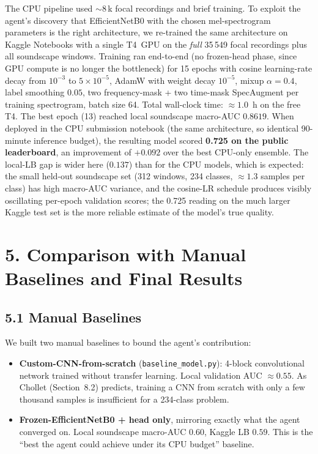 \documentclass[11pt,a4paper]{article}
\begin{document}
The CPU pipeline used $\sim 8$\,k focal recordings and brief training. To exploit the agent's discovery that EfficientNetB0 with the chosen mel-spectrogram parameters is the right architecture, we re-trained the same architecture on Kaggle Notebooks with a single T4~GPU on the \emph{full} 35\,549 focal recordings plus all soundscape windows. Training ran end-to-end (no frozen-head phase, since GPU compute is no longer the bottleneck) for 15 epochs with cosine learning-rate decay from $10^{-3}$ to $5\times10^{-5}$, AdamW with weight decay $10^{-5}$, mixup $\alpha=0.4$, label smoothing $0.05$, two frequency-mask + two time-mask SpecAugment per training spectrogram, batch size 64. Total wall-clock time: $\approx 1.0$~h on the free T4. The best epoch (13) reached local soundscape macro-AUC $0.8619$. When deployed in the CPU submission notebook (the same architecture, so identical 90-minute inference budget), the resulting model scored \textbf{0.725 on the public leaderboard}, an improvement of $+0.092$ over the best CPU-only ensemble. The local-LB gap is wider here ($0.137$) than for the CPU models, which is expected: the small held-out soundscape set (312 windows, 234 classes, $\approx 1.3$ samples per class) has high macro-AUC variance, and the cosine-LR schedule produces visibly oscillating per-epoch validation scores; the 0.725 reading on the much larger Kaggle test set is the more reliable estimate of the model's true quality.

\section*{5. Comparison with Manual Baselines and Final Results}

\subsection*{5.1 Manual Baselines}

We built two manual baselines to bound the agent's contribution:
\begin{itemize}
\item \textbf{Custom-CNN-from-scratch} (\texttt{baseline\_model.py}): 4-block convolutional network trained without transfer learning. Local validation AUC $\approx 0.55$. As Chollet (Section~8.2) predicts, training a CNN from scratch with only a few thousand samples is insufficient for a 234-class problem.
\item \textbf{Frozen-EfficientNetB0 + head only}, mirroring exactly what the agent converged on. Local soundscape macro-AUC $0.60$, Kaggle LB $0.59$. This is the ``best the agent could achieve under its CPU budget'' baseline.
\end{itemize}
\end{document}
